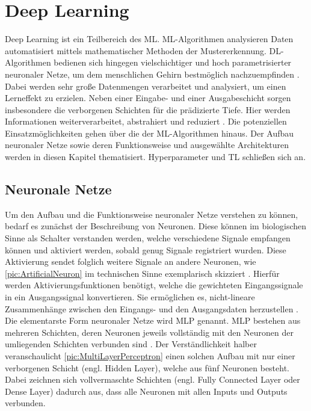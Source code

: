 \chapter{Deep Learning}
\thispagestyle{fancy}
\label{chap:Deep Learning}

\noindent
Deep Learning ist ein Teilbereich des \ac{ML}. \ac{ML}-Algorithmen analysieren Daten automatisiert mittels mathematischer Methoden der Mustererkennung. \ac{DL}-Algorithmen bedienen sich hingegen vielschichtiger und hoch parametrisierter neuronaler Netze, um dem menschlichen Gehirn bestmöglich nachzuempfinden \cite[S.~455-457]{KHA19}. Dabei werden sehr große Datenmengen verarbeitet und analysiert, um einen Lerneffekt zu erzielen. Neben einer Eingabe- und einer Ausgabeschicht sorgen insbesondere die verborgenen Schichten für die prädizierte Tiefe. Hier werden Informationen weiterverarbeitet, abstrahiert und reduziert \cite[S.~131]{ZHA20}. Die potenziellen Einsatzmöglichkeiten gehen über die der \ac{ML}-Algorithmen hinaus. Der Aufbau neuronaler Netze sowie deren Funktionsweise und ausgewählte Architekturen werden in diesen Kapitel thematisiert. Hyperparameter und \ac{TL} schließen sich an.


\section{Neuronale Netze}
\noindent
Um den Aufbau und die Funktionsweise neuronaler Netze verstehen zu können, bedarf es zunächst der Beschreibung von Neuronen. Diese können im biologischen Sinne als Schalter verstanden werden, welche verschiedene Signale empfangen können und aktiviert werden, sobald genug Signale registriert wurden. Diese Aktivierung sendet folglich weitere Signale an andere Neuronen, wie \autoref{pic:ArtificialNeuron} im technischen Sinne exemplarisch skizziert \cite[S.~42]{KRI05}. Hierfür werden Aktivierungsfunktionen benötigt, welche die gewichteten Eingangssignale in ein Ausgangssignal konvertieren. Sie ermöglichen es, nicht-lineare Zusammenhänge zwischen den Eingangs- und den Ausgangsdaten herzustellen \cite[S.~134]{ZHA20}.\\

\noindent
Die elementarste Form neuronaler Netze wird \ac{MLP} genannt. \ac{MLP} bestehen aus mehreren Schichten, deren Neuronen jeweils vollständig mit den Neuronen der umliegenden Schichten verbunden sind \cite[S.~131]{ZHA20}. Der Verständlichkeit halber veranschaulicht \autoref{pic:MultiLayerPerceptron} einen solchen Aufbau mit nur einer verborgenen Schicht (engl. Hidden Layer), welche aus fünf Neuronen besteht. Dabei zeichnen sich vollvermaschte Schichten (engl. Fully Connected Layer oder Dense Layer) dadurch aus, dass alle Neuronen mit allen Inputs und Outputs verbunden.\\

